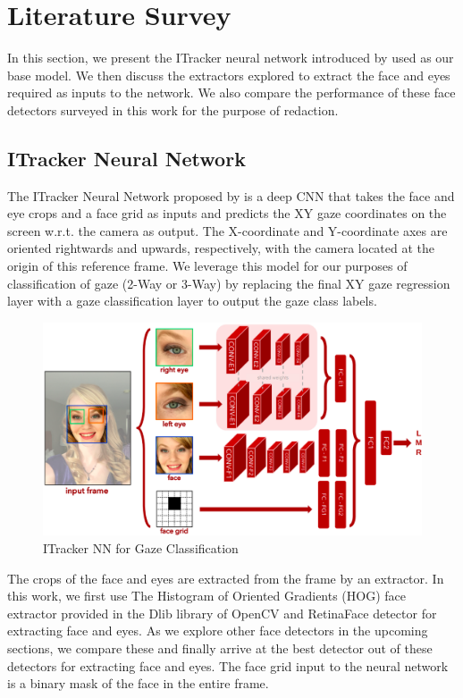 \chapter{Literature Survey}

In this section, we present the ITracker neural network introduced by \cite{MIT_EyeTracking_paper} used as our base model. We then discuss the extractors explored to extract the face and eyes required as inputs to the network. We also compare the performance of these face detectors surveyed in this work for the purpose of redaction.


\section{ITracker Neural Network}
The ITracker Neural Network proposed by \cite{MIT_EyeTracking_paper} is a deep CNN that takes the face and eye crops and a face grid as inputs and predicts the XY gaze coordinates on the screen w.r.t. the camera as output. The X-coordinate and Y-coordinate axes are oriented rightwards and upwards, respectively, with the camera located at the origin of this reference frame. We leverage this model for our purposes of classification of gaze (2-Way or 3-Way) by replacing the final XY gaze regression layer with a gaze classification layer to output the gaze class labels.

\begin{figure}[h]
  \centering
    \includegraphics[width=1.0\textwidth]{LiteratureSurvey/ITrackerNN}
    \caption[ITracker NN]{ITracker NN for Gaze Classification}
    \label{fig:iTrackerNN} 
\end{figure}

The crops of the face and eyes are extracted from the frame by an extractor. In this work, we first use The Histogram of Oriented Gradients (HOG) face extractor provided in the Dlib library of OpenCV and RetinaFace detector for extracting face and eyes. As we explore other face detectors in the upcoming sections, we compare these and finally arrive at the best detector out of these detectors for extracting face and eyes. The face grid input to the neural network is a binary mask of the face in the entire frame.


